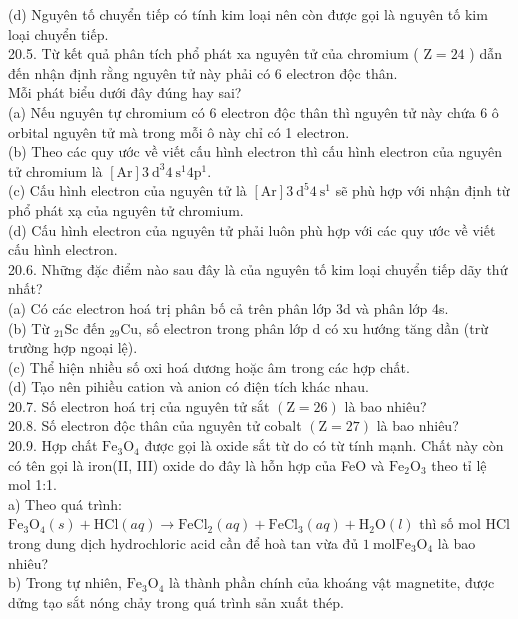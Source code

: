 \documentclass[10pt]{article}
\begin{document}
(d) Nguyên tố chuyển tiếp có tính kim loại nên còn được gọi là nguyên tố kim loại chuyển tiếp.\\
20.5. Từ kết quả phân tích phổ phát xa nguyên tử của chromium ( $\mathrm{Z}=24$ ) dẫn đến nhận định rằng nguyên tử này phải có 6 electron độc thân.\\
Mỗi phát biểu dưới đây đúng hay sai?\\
(a) Nếu nguyên tự chromium có 6 electron độc thân thì nguyên tử này chứa 6 ô orbital nguyên tử mà trong mỗi ô này chỉ có 1 electron.\\
(b) Theo các quy ước về viết cấu hình electron thì cấu hình electron của nguyên tử chromium là $[\mathrm{Ar}] 3 \mathrm{~d}^{3} 4 \mathrm{~s}^{1} 4 \mathrm{p}^{1}$.\\
(c) Cấu hình electron của nguyên tử là $[\mathrm{Ar}] 3 \mathrm{~d}^{5} 4 \mathrm{~s}^{1}$ sẽ phù hợp với nhận định từ phổ phát xạ của nguyên tử chromium.\\
(d) Cấu hình electron của nguyên tử phải luôn phù hợp với các quy ước về viết cấu hình electron.\\
20.6. Những đặc điểm nào sau đây là của nguyên tố kim loại chuyển tiếp dãy thứ nhất?\\
(a) Có các electron hoá trị phân bố cả trên phân lớp 3d và phân lớp 4s.\\
(b) Từ ${ }_{21} \mathrm{Sc}$ đến ${ }_{29} \mathrm{Cu}$, số electron trong phân lớp d có xu hướng tăng dần (trừ trường hợp ngoại lệ).\\
(c) Thể hiện nhiều số oxi hoá dương hoặc âm trong các hợp chất.\\
(d) Tạo nên pihiều cation và anion có điện tích khác nhau.\\
20.7. Số electron hoá trị của nguyên tử sắt $(\mathrm{Z}=26)$ là bao nhiêu?\\
20.8. Số electron độc thân của nguyên tử cobalt $(\mathrm{Z}=27)$ là bao nhiêu?\\
20.9. Hợp chất $\mathrm{Fe}_{3} \mathrm{O}_{4}$ được gọi là oxide sắt từ do có từ tính mạnh. Chất này còn có tên gọi là iron(II, III) oxide do đây là hỗn hợp của FeO và $\mathrm{Fe}_{2} \mathrm{O}_{3}$ theo tỉ lệ mol 1:1.\\
a) Theo quá trình: $\mathrm{Fe}_{3} \mathrm{O}_{4}(s)+\mathrm{HCl}(a q) \rightarrow \mathrm{FeCl}_{2}(a q)+\mathrm{FeCl}_{3}(a q)+\mathrm{H}_{2} \mathrm{O}(l)$ thì số mol HCl trong dung dịch hydrochloric acid cần để hoà tan vừa đủ $1 \mathrm{~mol} \mathrm{Fe}_{3} \mathrm{O}_{4}$ là bao nhiêu?\\
b) Trong tự nhiên, $\mathrm{Fe}_{3} \mathrm{O}_{4}$ là thành phần chính của khoáng vật magnetite, được dửng tạo sắt nóng chảy trong quá trình sản xuất thép.\\
\end{document}
